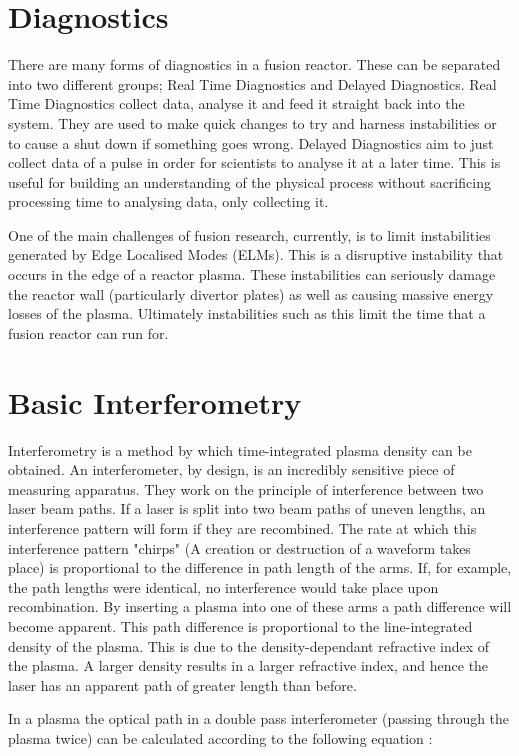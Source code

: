 \documentclass[12pt,a4paper,oneside]{report}
\begin{document}
	\section{Diagnostics}
There are many forms of diagnostics in a fusion reactor. These can be separated into two different groups; Real Time Diagnostics and Delayed Diagnostics. Real Time Diagnostics collect data, analyse it and feed it straight back into the system. They are used to make quick changes to try and harness instabilities or to cause a shut down if something goes wrong. Delayed Diagnostics aim to just collect data of a pulse in order for scientists to analyse it at a later time. This is useful for building an understanding of the physical process without sacrificing processing time to analysing data, only collecting it. 
\medskip

One of the main challenges of fusion research, currently, is to limit instabilities generated by Edge Localised Modes (ELMs). This is a disruptive instability that occurs in the edge of a reactor plasma. These instabilities can seriously damage the reactor wall (particularly divertor plates) as well as causing massive energy losses of the plasma. Ultimately instabilities such as this limit the time that a fusion reactor can run for.
	
	\section{Basic Interferometry}
Interferometry is a method by which time-integrated plasma density can be obtained. An interferometer, by design, is an incredibly sensitive piece of measuring apparatus. They work on the principle of interference between two laser beam paths. If a laser is split into two beam paths of uneven lengths, an interference pattern will form if they are recombined. The rate at which this interference pattern "chirps" (A creation or destruction of a waveform takes place) is proportional to the difference in path length of the arms. If, for example, the path lengths were identical, no interference would take place upon recombination. By inserting a plasma into one of these arms a path difference will become apparent. This path difference is proportional to the line-integrated density of the plasma. This is due to the density-dependant refractive index of the plasma. A larger density results in a larger refractive index, and hence the laser has an apparent path of greater length than before.

In a plasma the optical path in a double pass interferometer (passing through the plasma twice) can be calculated according to the following equation \cite[p.~26]{Brunner2017} :
\end{document}
